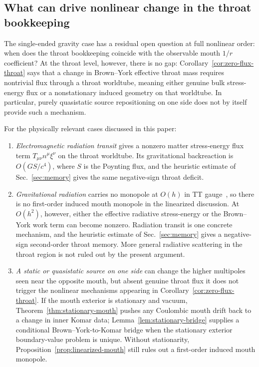 \documentclass[aps,prd,onecolumn,nofootinbib,superscriptaddress]{revtex4-2}
\begin{document}
\subsection{What can drive nonlinear change in the throat bookkeeping}

The single-ended gravity case has a residual open question at full nonlinear
order: when does the throat bookkeeping coincide with the observable mouth
$1/r$ coefficient?  At the throat level, however, there is no gap:
Corollary~\ref{cor:zero-flux-throat} says that a change in Brown--York
effective throat mass requires nontrivial flux through a throat worldtube,
meaning either genuine bulk stress-energy flux or a nonstationary induced
geometry on that worldtube.  In particular, purely quasistatic source
repositioning on one side does not by itself provide such a mechanism.

For the physically relevant cases discussed in this paper:

\begin{enumerate}
  \item \emph{Electromagnetic radiation transit} gives a nonzero matter
    stress-energy flux term $T_{\mu\nu}n^\mu\xi^\nu$ on the throat worldtube.
    Its gravitational backreaction is $O(GS/c^4)$, where $S$ is the Poynting
    flux, and the heuristic estimate of Sec.~\ref{sec:memory} gives the same
    negative-sign throat deficit.

  \item \emph{Gravitational radiation} carries no monopole at $O(h)$ in TT
    gauge~\cite{Thorne1980Multipole}, so there is no first-order induced mouth
    monopole in the linearized discussion.  At $O(h^2)$, however, either the
    effective radiative stress-energy or the Brown--York work term can become
    nonzero.  Radiation transit is one concrete mechanism, and the heuristic
    estimate of Sec.~\ref{sec:memory} gives a negative-sign second-order throat memory.
    More general radiative scattering in the throat region is not ruled out by
    the present argument.

  \item \emph{A static or quasistatic source on one side} can change the
    higher multipoles seen near the opposite mouth, but absent genuine throat
    flux it does not trigger the nonlinear mechanisms appearing in
    Corollary~\ref{cor:zero-flux-throat}.  If the mouth exterior is stationary and
    vacuum, Theorem~\ref{thm:stationary-mouth} pushes any Coulombic mouth drift
    back to a change in inner Komar data; Lemma~\ref{lem:stationary-bridge}
    supplies a conditional Brown--York-to-Komar bridge when the stationary
    exterior boundary-value problem is unique.  Without stationarity,
    Proposition~\ref{prop:linearized-mouth} still rules out a first-order
    induced mouth monopole.
\end{enumerate}
\end{document}
